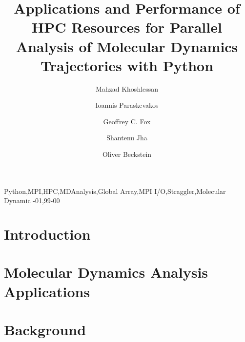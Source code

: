 \documentclass[review]{elsarticle}
\begin{document}
\begin{frontmatter}    

\title{Applications and Performance of HPC Resources for Parallel Analysis of Molecular Dynamics Trajectories with Python}

\author[ASUphysics]{Mahzad Khoshlessan}

\author[Rutgers]{Ioannis Paraskevakos}

\author[IndianaDSC]{Geoffrey C. Fox}

\author[Rutgers]{Shantenu Jha}

\author[ASUphysics,ASUCBP]{Oliver Beckstein}

\address[ASUphysics]{Department of Physics, Arizona State University,
  Tempe, AZ 85281, USA}
\address[ASUCBP]{Center for Biological Physics, Arizona State University,
  Tempe, AZ 85281, USA}
\address[Rutgers]{Department of Electrical \& Computer Engineering,
  Rutgers University, Piscataway, NJ 08854, USA}
\address[IndianaDSC]{Digital Science Center, Indiana University,
  Bloomington, IN 47405}

    


\begin{keyword}
Python\sep MPI\sep HPC\sep MDAnalysis\sep Global Array\sep MPI I/O\sep Straggler\sep Molecular Dynamic
-01\sep  99-00
\end{keyword}

\end{frontmatter}

\linenumbers

\section{Introduction}


\section{Molecular Dynamics Analysis Applications}


\section{Background}

\end{document}
